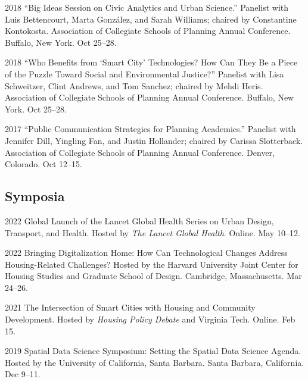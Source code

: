 \documentclass[11pt,letterpaper]{report}
\begin{document}
\begin{tablist}
        \item[2018] \tab{}\enquote{Big Ideas Session on Civic Analytics and Urban Science.} Panelist with Luis Bettencourt, Marta Gonz{\'a}lez, and Sarah Williams; chaired by Constantine Kontokosta. Association of Collegiate Schools of Planning Annual Conference. Buffalo, New York. Oct 25--28.

        \item[2018] \tab{}\enquote{Who Benefits from \enquote{Smart City} Technologies? How Can They Be a Piece of the Puzzle Toward Social and Environmental Justice?} Panelist with Lisa Schweitzer, Clint Andrews, and Tom Sanchez; chaired by Mehdi Heris. Association of Collegiate Schools of Planning Annual Conference. Buffalo, New York. Oct 25--28.

        \item[2017] \tab{}\enquote{Public Communication Strategies for Planning Academics.} Panelist with Jennifer Dill, Yingling Fan, and Justin Hollander; chaired by Carissa Slotterback. Association of Collegiate Schools of Planning Annual Conference. Denver, Colorado. Oct 12--15.

    \end{tablist}

    \subsection*{Symposia}

    \begin{tablist}

        \item[2022] \tab{}Global Launch of the Lancet Global Health Series on Urban Design, Transport, and Health. Hosted by \textit{The Lancet Global Health}. Online. May 10--12.

        \item[2022] \tab{}Bringing Digitalization Home: How Can Technological Changes Address Housing-Related Challenges? Hosted by the Harvard University Joint Center for Housing Studies and Graduate School of Design. Cambridge, Massachusetts. Mar 24--26.

        \item[2021] \tab{}The Intersection of Smart Cities with Housing and Community Development. Hosted by \textit{Housing Policy Debate} and Virginia Tech. Online. Feb 15.

        \item[2019] \tab{}Spatial Data Science Symposium: Setting the Spatial Data Science Agenda. Hosted by the University of California, Santa Barbara. Santa Barbara, California. Dec 9--11.

    \end{tablist}
\end{document}
